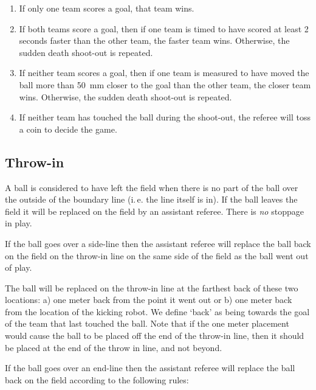 \documentclass[12pt]{article}
\newcommand{\ie}{\mbox{i.\,e.}\xspace}
\begin{document}
\begin{enumerate}

\item If only one team scores a goal, that team wins.

\item If both teams score a goal, then if one team is timed to have scored at least 2 seconds faster than the other team, the faster team wins. Otherwise, the sudden death shoot-out is repeated.

\item If neither team scores a goal, then if one team is measured to have moved the ball more than 50~mm closer to the goal than the other team, the closer team wins. Otherwise, the sudden death shoot-out is repeated.

\item If neither team has touched the ball during the shoot-out, the referee will toss a coin to decide the game.

\end{enumerate}

\subsection{Throw-in}
\label{sec:throw_in}

A ball is considered to have left the field when there is no part of the ball over the outside of the boundary line (\ie the line itself is in). If the ball leaves the field it will be replaced on the field by an assistant referee. There is \emph{no} stoppage in play.

If the ball goes over a side-line then the assistant referee will replace the ball back on the field on the throw-in line on the same side of the field as the ball went out of play.

The ball will be replaced on the throw-in line at the farthest back of these two locations: a) one meter back from the point it went out or b) one meter back from the location of the kicking robot. We define `back' as being towards the goal of the team that last touched the ball. Note that if the one meter placement would cause the ball to be placed off the end of the throw-in line, then it should be placed at the end of the throw in line, and not beyond.

If the ball goes over an end-line then the assistant referee will replace the ball back on the field according to the following rules:
\end{document}
